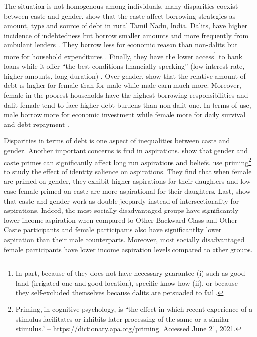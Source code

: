 \documentclass[a4paper, 11pt, onecolumn]{article}
\begin{document}
The situation is not homogenous among individuals, many disparities coexist between caste and gender.
\cite{Guerin2013a} show that the caste affect borrowing strategies as amount, type and source of debt in rural Tamil Nadu, India.
Dalits, have higher incidence of indebtedness but borrow smaller amounts and more frequently from ambulant lenders \citep{Guerin2013a}.
They borrow less for economic reason than non-dalits but more for household expenditures \citep{Guerin2013a, Guerin2014a}.
Finally, they have the lower access\footnote{In part, because of they does not have necessary guarantee (i) such as good land (irrigated one and good location), specific know-how (ii), or because they self-excluded themselves because dalits are persuaded to fail \citep{Guerin2013a}.} to bank loans while it offer ``the best conditions financially speaking'' (low interest rate, higher amounts, long duration) \citep{Guerin2013a, Chavan2007}.
Over gender, \cite{Reboul2021} show that the relative amount of debt is higher for female than for male while male earn much more.
Moreover, female in the poorest households have the highest borrowing responsibilities and dalit female tend to face higher debt burdens than non-dalit one.
In terms of use, male borrow more for economic investment while female more for daily survival and debt repayment \citep{Reboul2021}.

Disparities in terms of debt is one aspect of inequalities between caste and gender.
Another important concerns is find in aspirations.
\cite{Mukherjee2017} show that gender and caste primes can significantly affect long run aspirations and beliefs. 
\cite{Alvi2019} use priming\footnote{Priming, in cognitive psychology, is ``the effect in which recent experience of a stimulus facilitates or inhibits later processing of the same or a similar stimulus.'' -- \url{https://dictionary.apa.org/priming}. Accessed June 21, 2021.} to study the effect of identity salience on aspirations.
They find that when female are primed on gender, they exhibit higher aspirations for their daughters and low-case female primed on caste are more aspirational for their daughters.
Last, \cite{Sarkar2020} show that caste and gender work as double jeopardy instead of intersectionality for aspirations.
Indeed, the most socially disadvantaged groups have significantly lower income aspiration when compared to Other Backward Class and Other Caste participants and female participants also have significantlty lower aspiration than their male counterparts.
Moreover, most socially disadvantaged female participants have lower income aspiration levels compared to other groups.
\end{document}
